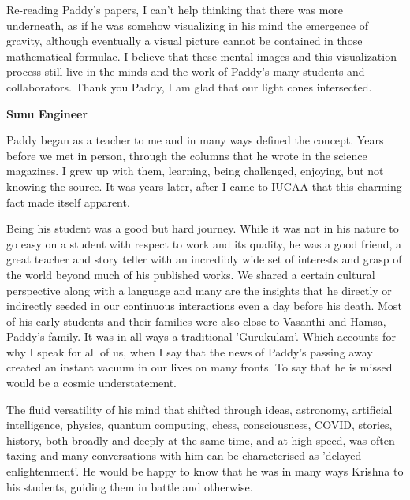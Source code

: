 \documentclass[prd, preprint, longbibliography, 11pt]{revtex4-1}
\begin{document}
Re-reading Paddy's papers, I can't help thinking that there was more 
underneath, as if he was somehow visualizing in his mind the emergence of 
gravity, although eventually a visual picture cannot be contained in those 
mathematical formulae.  I believe that these mental images and this 
visualization process still live in the minds and the work of Paddy's many 
students and collaborators. Thank you Paddy, I am glad that our light 
cones intersected.

\bigskip

\bigskip

\centerline{{\bf Sunu Engineer} }
\medskip
\noindent Paddy began as a teacher to me and in many ways defined the concept. Years before we met in person, through the columns that he wrote in the science magazines. I grew up with them, learning, being challenged, enjoying, but not knowing the source. It was years later, after I came to IUCAA that this charming fact made itself apparent. 
\par 
Being his student was a good but hard journey. While it  was not in his nature to go easy on a student with respect to work and its quality, he was a good friend, a great teacher and story teller with an incredibly wide set of interests and grasp of the world beyond much of his published works. We shared a certain cultural perspective along with a language and many are the insights that he directly or indirectly seeded in our continuous interactions even a day before his death. Most of his  early students and their families  were also close to Vasanthi and Hamsa, Paddy's family. It was in all ways a traditional 'Gurukulam'. Which accounts for why I speak for all of us, when I say that the news of Paddy's passing away created an instant vacuum in our lives on many fronts. To say that he is missed would be a cosmic understatement.
\par
The fluid versatility of his mind that shifted through ideas,  astronomy, artificial intelligence, physics, quantum computing, chess, consciousness, COVID, stories, history, both broadly and deeply at the same time, and at high speed, was often taxing and many conversations with him can be characterised as 'delayed enlightenment'. He would be happy to know that he was in many ways Krishna to his students, guiding them in battle and otherwise.


\bigskip

\bigskip
\end{document}

